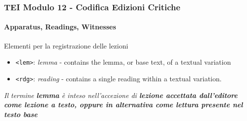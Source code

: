 \begin{frame}
    \frametitle{TEI Modulo 12 - Codifica Edizioni Critiche}
    \framesubtitle{Apparatus, Readings, Witnesses}
    \addtocounter{nframe}{1}








    \begin{block}{Elementi per la registrazione delle lezioni}
        
        \begin{itemize}
            \item \texttt{<lem>}: \textit{lemma} - contains the lemma, or base text, of a textual variation
            \item \texttt{<rdg>}: \textit{reading} - contains a single reading within a textual variation.
        \end{itemize}

    \end{block}

    \textit{Il termine \textbf{lemma} è inteso nell'accezione di \textbf{lezione accettata dall'editore come lezione a testo, oppure in alternativa come lettura presente nel testo base}}

\end{frame}


